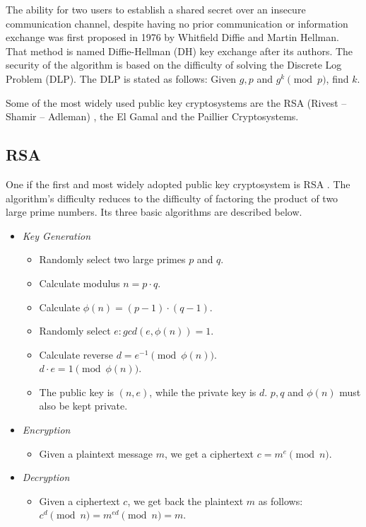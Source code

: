 The ability for two users to establish a shared secret over an insecure communication channel, despite having no prior communication or information exchange was first proposed in 1976 by Whitfield Diffie and Martin Hellman.
That method is named Diffie-Hellman (DH) key exchange \cite{diffie1976new} after its authors. The security of the algorithm is based on the difficulty of solving the Discrete Log Problem (DLP). The DLP is stated as follows: Given $g, p$ and $g^k \pmod{p}$, find $k$.

Some of the most widely used public key cryptosystems are the RSA (Rivest -- Shamir -- Adleman) \cite{rivest1978method}, the El Gamal \cite{elgamal1985public} and the Paillier \cite{paillier1999public} Cryptosystems.

\subsection{RSA}

One if the first and most widely adopted public key cryptosystem is RSA . The algorithm's difficulty reduces to the difficulty of factoring the product of two large prime numbers. Its three basic algorithms are described below.

\begin{itemize}
  \item \textit{Key Generation}
  \begin{itemize}
    \item Randomly select two large primes $p$ and $q$.
    \item Calculate modulus $n = p \cdot q$.
    \item Calculate $\phi(n) = (p-1) \cdot (q-1)$.
    \item Randomly select $e : gcd(e,\phi(n)) = 1$.
    \item Calculate reverse $d  = e ^ {-1} \pmod{\phi(n)}$.\\
    $d \cdot e = 1 \pmod{\phi(n)}$.
    \item The public key is $(n, e)$, while the private key is $d$. $p, q$ and $\phi(n)$ must also be kept private.
  \end{itemize}
  \item \textit{Encryption}
  \begin{itemize}
    \item Given a plaintext message $m$, we get a ciphertext $c = m ^ e \pmod{n}$.
  \end{itemize}
  \item \textit{Decryption}
  \begin{itemize}
    \item Given a ciphertext $c$, we get back the plaintext $m$ as follows: $c^d \pmod{n} = m^{ed} \pmod{n} = m$.
  \end{itemize}
\end{itemize}


